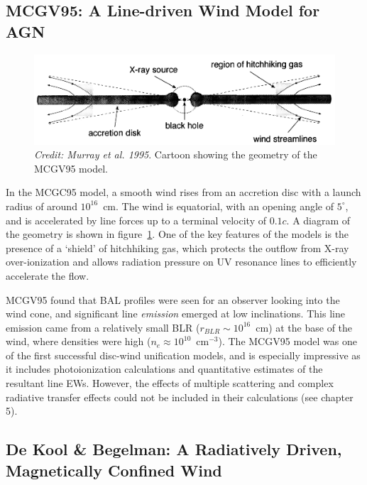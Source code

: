 \subsection{MCGV95: A Line-driven Wind Model for AGN}

\begin{figure}
\centering
\includegraphics[width=1.0\textwidth]{figures/02-outflows/MCGV95.png}
\caption
{
{\sl Credit: Murray et al. 1995}. 
Cartoon showing the geometry of the MCGV95 model.
} 
\label{fig:MCGV95}
\end{figure}

In the MCGC95 model, a smooth wind rises from an accretion disc with a launch
radius of around $10^{16}$~cm. The wind is equatorial, with an opening angle
of $5^\circ$, and is accelerated by line forces up to a terminal velocity of $0.1c$.
A diagram of the geometry is shown in figure~\ref{fig:MCGV95}.
One of the key features of the models is the presence of a `shield' of hitchhiking
gas, which protects the outflow from X-ray over-ionization 
and allows radiation pressure on UV resonance lines to efficiently 
accelerate the flow. 

MCGV95 found that BAL profiles were
seen for an observer looking into the wind cone, and significant
line {\em emission} emerged at low inclinations. This line emission came
from a relatively small BLR ($r_{BLR} \sim10^{16}$~cm) at the base of the wind, 
where densities were high ($n_e \approx 10^{10}$~cm$^{-3}$). 
The MCGV95 model was one of the first successful disc-wind unification models,
and is especially impressive as it includes photoionization calculations and 
quantitative estimates of the resultant line EWs. However, the effects of multiple
scattering and complex radiative transfer effects could not be included 
in their calculations (see chapter 5).

\subsection{De Kool \& Begelman: A Radiatively Driven, Magnetically Confined Wind}

